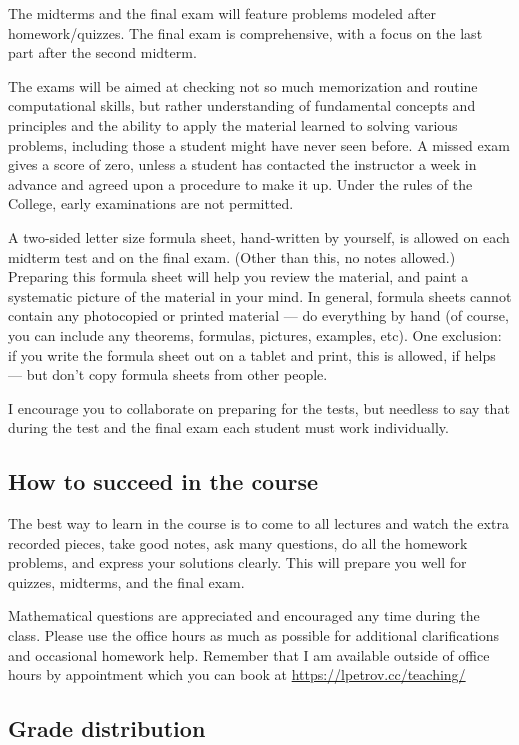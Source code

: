 \documentclass[oneside,11pt]{amsart}
\begin{document}
The midterms and the final exam will feature
problems modeled after homework/quizzes.
The final exam is comprehensive, with a focus on the last part
after the second midterm.

The exams will be aimed at checking not so much memorization and
routine computational skills, but rather understanding of fundamental
concepts and principles and the ability to apply the material
learned to solving various problems, including those a student might
have never seen before. A missed exam gives a score of zero, unless a
student has contacted the instructor a week in advance and agreed upon a
procedure to make it up. Under the rules of
the College, early examinations are not permitted.

\medskip

A two-sided letter size formula sheet, hand-written by yourself, is
allowed on each midterm test and on the final exam.
(Other than this, no notes allowed.)
Preparing this formula sheet
will help you review the material, and paint a systematic picture of the material in your mind.
In general, formula sheets cannot contain any photocopied or
printed material --- do everything by hand (of course, you can
include any theorems, formulas, pictures, examples, etc).
One exclusion: if you write the formula sheet out on a
tablet and print, this is allowed, if helps --- but don't copy
formula sheets from other people.

I encourage you to collaborate on preparing for the tests, but needless to say that
during the test and the final exam each student must work individually.

\subsection*{How to succeed in the course}

The best way to learn in the course is to come to all lectures and watch the extra recorded pieces, take good notes,
ask many questions,
do all the homework problems, and express your solutions
clearly.
This will prepare you well for quizzes, midterms, and the final exam.

Mathematical questions are appreciated and encouraged any time during the
class. Please use the office hours as much as possible for additional
clarifications and occasional homework help. Remember that I am available outside 
of office hours by appointment which you can book at
\url{https://lpetrov.cc/teaching/}

\subsection{Grade distribution}
\end{document}
